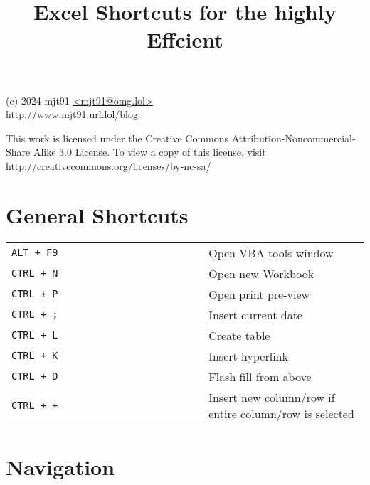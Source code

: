 \documentclass[8pt]{extarticle} %
\begin{document}
\raggedright

\begin{multicols}{2}

\title{Excel Shortcuts for the highly Effcient}

{\small
(c) 2024 mjt91 \url{<mjt91@omg.lol>}\\
\url{http://www.mjt91.url.lol/blog}

This work is licensed under the Creative Commons Attribution-Noncommercial-Share
Alike 3.0 License. To view a copy of this license, visit
\url{http://creativecommons.org/licenses/by-nc-sa/}
}

\vspace*{1pt}

\section{General Shortcuts}

  \vspace{1ex}
  \begin{tabular}{L{0.55\linewidth} L{0.45\linewidth}}

    \tt ALT + F9                & Open VBA tools window \\
    \tt CTRL + N                & Open new Workbook \\
    \tt CTRL + P                & Open print pre-view \\
    \tt CTRL + ;                & Insert current date \\
    \tt CTRL + L                & Create table \\
    \tt CTRL + K                & Insert hyperlink \\
    \tt CTRL + D                & Flash fill from above \\
    \tt CTRL + +                & Insert new column/row if entire column/row is selected \\

  \end{tabular}
  
\section{Navigation}

  \begin{tabular}{L{0.55\linewidth} L{0.45\linewidth}}


\end{tabular}
\end{multicols}
\end{document}
